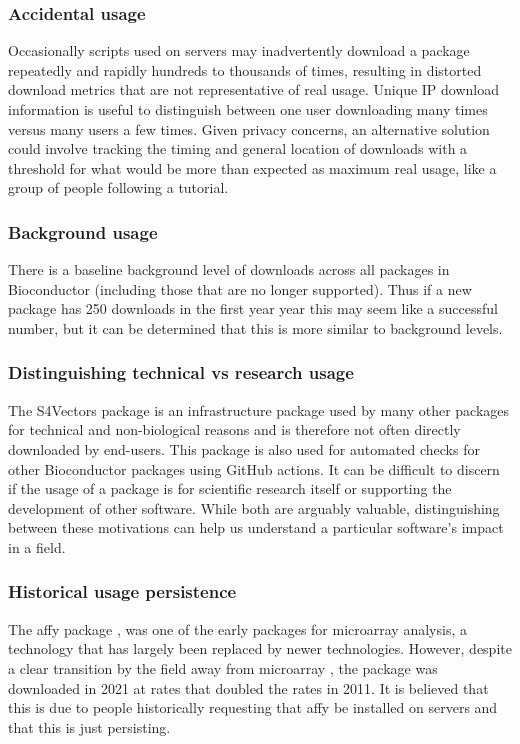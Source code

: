 \documentclass{article}
\begin{document}
\subsubsection{Accidental usage} 
Occasionally scripts used on servers may inadvertently download a package repeatedly and rapidly hundreds to thousands of times, resulting in distorted download metrics that are not representative of real usage. Unique IP download information is useful to distinguish between one user downloading many times versus many users a few times. Given privacy concerns, an alternative solution could involve tracking the timing and general location of downloads with a threshold for what would be more than expected as maximum real usage, like a group of people following a tutorial.

\subsubsection{Background usage}
There is a baseline background level of downloads across all packages in Bioconductor (including those that are no longer supported). Thus if a new package has 250 downloads in the first year year this may seem like a successful number, but it can be determined that this is more similar to background levels.

\subsubsection{Distinguishing technical vs research usage}

The S4Vectors package is an infrastructure package used by many other packages for technical and non-biological reasons and is therefore not often directly downloaded by end-users. This package is also used for automated checks for other Bioconductor packages using GitHub actions. It can be difficult to discern if the usage of a package is for scientific research itself or supporting the development of other software. While both are arguably valuable, distinguishing between these motivations can help us understand a particular software's impact in a field.  

\subsubsection{Historical usage persistence}

The affy package \cite{affy}, was one of the early packages for microarray analysis, a technology that has largely been replaced by newer technologies. However, despite a clear transition by the field away from microarray \cite{mantione_comparing_2014}, the package was downloaded in 2021 at rates that doubled the rates in 2011. It is believed that this is due to people historically requesting that affy be installed on servers and that this is just persisting. 
\end{document}

